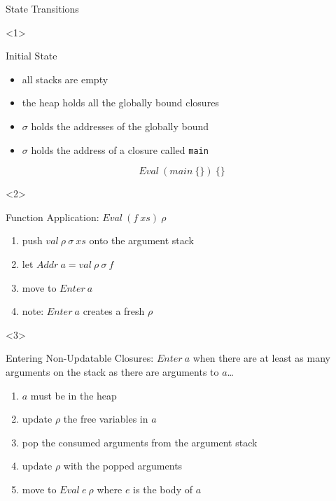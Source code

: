 \documentclass{beamer}
\begin{document}
\begin{frame}[fragile]{State Transitions}
  \begin{onlyenv}<1>
    \begin{block}{Initial State}
      \begin{itemize}
      \item all stacks are empty
      \item the heap holds all the globally bound closures
      \item $\sigma$ holds the addresses of the globally bound
      \item $\sigma$ holds the address of a closure called \texttt{main}
      \end{itemize}

      \[Eval\ (main\ \{\})\ \{\}\]
    \end{block}
  \end{onlyenv}

  \begin{onlyenv}<2>
    \begin{block}{Function Application: $Eval\ (f\ xs)\ \rho$}
      \begin{enumerate}
      \item push $val\ \rho\ \sigma\ xs$ onto the argument stack
      \item let $Addr\ a = val\ \rho\ \sigma\ f$
      \item move to $Enter\ a$
      \item[] note: $Enter\ a$ creates a fresh $\rho$
      \end{enumerate}
    \end{block}
  \end{onlyenv}

  \begin{onlyenv}<3>
    \begin{block}{Entering Non-Updatable Closures: $Enter\ a$}
      when there are at least as many arguments on the stack as there are
      arguments to $a$\ldots
      \begin{enumerate}
      \item $a$ must be in the heap
      \item update $\rho$ the free variables in $a$
      \item pop the consumed arguments from the argument stack
      \item update $\rho$ with the popped arguments
      \item move to $Eval\ e\ \rho$ where $e$ is the body of $a$
      \end{enumerate}
    \end{block}
  \end{onlyenv}


\end{frame}
\end{document}

